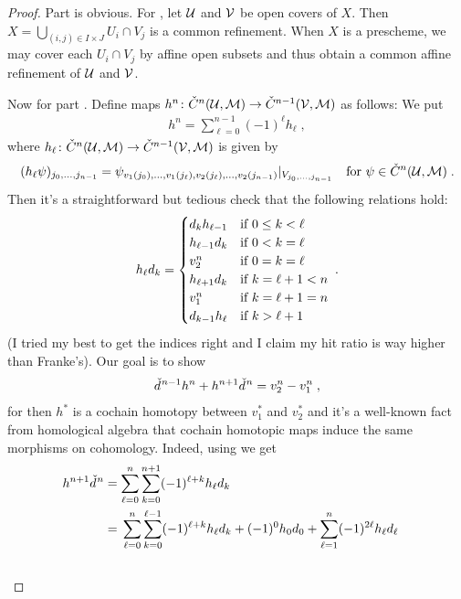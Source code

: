 \documentclass[a4paper,parskip=half,numbers=enddot, DIV=12]{scrreprt}
\begin{document}
\begin{proof}
	Part  is obvious. For , let $\mathcal{U}$ and $\mathcal{V}$ be open covers of $X$. Then $X=\bigcup_{(i,j)\in I\times J}U_i\cap V_j$ is a common refinement. When $X$ is a prescheme, we may cover each $U_i\cap V_j$ by affine open subsets and thus obtain a common affine refinement of $\mathcal{U}$ and $\mathcal{V}$.
	
	Now for part . Define maps $h^n\colon\check{C}^n(\Uu,\Mm)\morphism\check{C}^{n-1}(\Vv,\Mm)$ as follows: We put 
	\begin{align*}
		h^n=\sum_{\ell=0}^{n-1}(-1)^\ell h_\ell\;,
	\end{align*}
	where $h_\ell\colon\check{C}^n(\Uu,\Mm)\morphism\check{C}^{n-1}(\Vv,\Mm)$ is given by
	\begin{align*}
		(h_\ell\psi)_{j_0,\ldots,j_{n-1}}=\psi_{v_1(j_0),\ldots,v_1(j_\ell),v_2(j_\ell),\ldots,v_2(j_{n-1})}|_{V_{j_0,\ldots,j_{n-1}}}\quad\text{for }\psi\in\check{C}^n(\mathcal{U},\mathcal{M})\;.
	\end{align*}
	Then it's a straightforward but tedious check that the following relations hold:
	\begin{align}\lbl{eq:SHIT}
		h_\ell d_k=\begin{cases}
			d_kh_{\ell-1} & \text{if }0\leq k<\ell\\
			h_{\ell-1}d_{k} & \text{if }0< k=\ell\\
			v_2^n & \text{if }0=k=\ell\\
			h_{\ell+1}d_{k} & \text{if }k=\ell+1<n\\
			v_1^n & \text{if }k=\ell+1=n\\
			d_{k-1}h_\ell & \text{if }k>\ell+1
		\end{cases}\;.
	\end{align}
	(I tried my best to get the indices right and I claim my hit ratio is way higher than Franke's). Our goal is to show 
	\begin{align*}
		\check{d}\hspace{0.06125em}^{n-1}h^n+h^{n+1}\check{d}\hspace{0.06125em}^n=v_2^n-v_1^n\;,
	\end{align*}
	for then $h^*$ is a cochain homotopy between $v_1^*$ and $v_2^*$ and it's a well-known fact from homological algebra that cochain homotopic maps induce the same morphisms on cohomology. Indeed, using  we get
	\begin{align*}
		h^{n+1}\hacek{d}^n&=\sum_{\ell=0}^{n}\sum_{k=0}^{n+1}(-1)^{\ell+k}h_\ell d_k\\
		&=\begin{multlined}[t]
			\sum_{\ell=0}^{n}\sum_{k=0}^{\ell-1}(-1)^{\ell+k}h_\ell d_k+(-1)^0h_0d_0+\sum_{\ell=1}^{n}(-1)^{2\ell}h_\ell d_\ell\\

\end{multlined}
\end{align*}
\end{proof}
\end{document}
